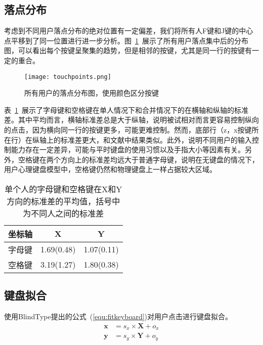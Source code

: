 \subsection{落点分布}
考虑到不同用户落点分布的绝对位置有一定偏差，我们将所有人F键和J键的中心点平移到了同一位置进行进一步分析\cite{flatglass2011findlater}\cite{palmboard2020}\cite{2018shitoast}。图~\ref{fig:points}~展示了所有用户落点集中后的分布图，可以看出每个按键呈聚集的趋势，但是相邻的按键，尤其是同一行的按键有一定的重合。

\begin{figure}[h] %
    \centering
    \texttt{[image: touchpoints.png]}
    \caption{所有用户的落点分布图，使用颜色区分按键}
    \label{fig:points}
\end{figure}

表~\ref{tab:sd}~展示了字母键和空格键在单人情况下和合并情况下的在横轴和纵轴的标准差。其中平均而言，横轴标准差总是大于纵轴，说明被试相对而言更容易控制纵向的点击，因为横向同一行的按键更多，可能更难控制。然而，底部行（z，x按键所在行）在纵轴上的标准差更大，和文献中结果类似\cite{flatglass2011findlater}。此外，说明不同用户的输入控制能力存在一定差异，可能与平时键盘的使用习惯以及手指大小等因素有关。另外，空格键在两个方向上的标准差均远大于普通字母键，说明在无键盘的情况下，用户心理键盘模型中，空格键仍然和物理键盘上一样占据较大区域。

\begin{table}[htb]
    \centering
    \begin{minipage}[t]{0.7\linewidth} %
    \caption[实验一按键标准差]{单个人的字母键和空格键在X和Y方向的标准差的平均值，括号中为不同人之间的标准差}
    \label{tab:sd}
      \centering
      \begin{tabularx}{0.7\linewidth}{c c c}
        \toprule[1.5pt]
        坐标轴 & X & Y\\\midrule[1pt]
        字母键 & 1.69(0.48) & 1.07(0.11)\\
        空格键 & 3.19(1.27) & 1.80(0.38)\\
        \bottomrule[1.5pt]
      \end{tabularx}
    \end{minipage}
  \end{table}

\subsection{键盘拟合}
使用BlindType\cite{2017blindtype}提出的公式~(\ref{equ:fitkeyboard})对用户点击进行键盘拟合。
\begin{equation}
  \label{equ:fitkeyboard}
  \begin{aligned}
  \textbf{x} &= s_{x} \times \textbf{X} + o_{x} \\
  \textbf{y} &= s_{y} \times \textbf{Y} + o_{y}
  \end{aligned}
\end{equation}

